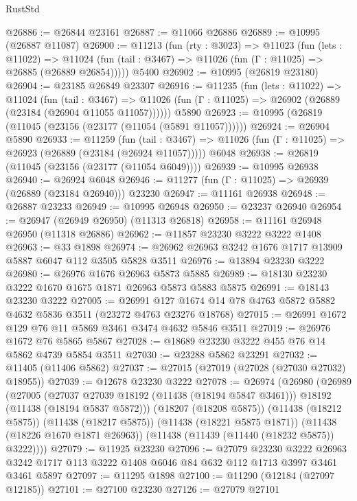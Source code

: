 \begin{lexlean}{RustStd}
\begin{coremodule}
@26886 := @26844 @23161
@26887 := @11066 @26886
@26889 := @10995 (@26887 @11087)
@26900 := @11213
    (fun (rty : @3023) =>
    @11023
      (fun (lets : @11022) =>
      @11024 (fun (tail : @3467) => @11026 (fun (Γ : @11025) => @26885 (@26889 @26854)))))
    @5400
@26902 := @10995 (@26819 @23180)
@26904 := @23185 @26849 @23307
@26916 := @11235
    (fun (lets : @11022) =>
    @11024
      (fun (tail : @3467) =>
      @11026 (fun (Γ : @11025) => @26902 (@26889 (@23184 (@26904 @11055 @11057))))))
    @5890
@26923 := @10995 (@26819 (@11045 (@23156 (@23177 (@11054 (@5891 @11057))))))
@26924 := @26904 @5890
@26933 := @11259
    (fun (tail : @3467) => @11026 (fun (Γ : @11025) => @26923 (@26889 (@23184 (@26924 @11057)))))
    @6048
@26938 := @26819 (@11045 (@23156 (@23177 (@11054 @6049))))
@26939 := @10995 @26938
@26940 := @26924 @6048
@26946 := @11277 (fun (Γ : @11025) => @26939 (@26889 (@23184 @26940))) @23230
@26947 := @11161 @26938
@26948 := @26887 @23233
@26949 := @10995 @26948
@26950 := @23237 @26940
@26954 := @26947 (@26949 @26950) (@11313 @26818)
@26958 := @11161 @26948 @26950 (@11318 @26886)
@26962 := @11857 @23230 @3222 @3222 @1408
@26963 := @33 @1898
@26974 := @26962 @26963 @3242 @1676 @1717 @13909 @5887 @6047 @112 @3505 @5828 @3511
@26976 := @13894 @23230 @3222
@26980 := @26976 @1676 @26963 @5873 @5885
@26989 := @18130 @23230 @3222 @1670 @1675 @1871 @26963 @5873 @5883 @5875
@26991 := @18143 @23230 @3222
@27005 := @26991 @127 @1674 @14 @78 @4763 @5872 @5882 @4632 @5836 @3511 (@23272 @4763 @23276 @18768)
@27015 := @26991 @1672 @129 @76 @11 @5869 @3461 @3474 @4632 @5846 @3511
@27019 := @26976 @1672 @76 @5865 @5867
@27028 := @18689 @23230 @3222 @455 @76 @14 @5862 @4739 @5854 @3511
@27030 := @23288 @5862 @23291
@27032 := @11405 (@11406 @5862)
@27037 := @27015 (@27019 (@27028 (@27030 @27032) @18955))
@27039 := @12678 @23230 @3222
@27078 := @26974
    (@26980
      (@26989
        (@27005
          (@27037 @27039 @18192 (@11438 (@18194 @5847 @3461)))
          @18192
          (@11438 (@18194 @5837 @5872)))
        (@18207 (@18208 @5875))
        (@11438 (@18212 @5875))
        (@11438 (@18217 @5875))
        (@11438 (@18221 @5875 @1871))
        (@11438 (@18226 @1670 @1871 @26963))
        (@11438 (@11439 (@11440 (@18232 @5875)) @3222))))
@27079 := @11925 @23230
@27096 := @27079
    @23230
    @3222
    @26963
    @3242
    @1717
    @113
    @3222
    @1408
    @6046
    @84
    @632
    @112
    @1713
    @3997
    @3461
    @3461
    @5897
@27097 := @11295 @1898
@27100 := @11290 (@12184 (@27097 @12185))
@27101 := @27100 @23230
@27126 := @27079
    @27101

\end{coremodule}
\end{lexlean}
